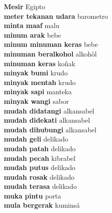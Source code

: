 \textbf{ Mesir  } Egipto \\
\textbf{ meter tekanan udara  } barometro \\
\textbf{ minta maaf  } malu \\
\textbf{ minum arak  } bebe \\
\textbf{ minum minuman keras  } bebe \\
\textbf{ minuman beralkohol  } alkohòl \\
\textbf{ minuman keras  } koñak \\
\textbf{ minyak bumi  } krudo \\
\textbf{ minyak mentah  } krudo \\
\textbf{ minyak sapi  } manteka \\
\textbf{ minyak wangi  } sabor \\
\textbf{ mudah didatangi  } alkansabel \\
\textbf{ mudah didekati  } alkansabel \\
\textbf{ mudah dihubungi  } alkansabel \\
\textbf{ mudah geli  } delikado \\
\textbf{ mudah patah  } delikado \\
\textbf{ mudah pecah  } kibrabel \\
\textbf{ mudah putus  } delikado \\
\textbf{ mudah rosak  } delikado \\
\textbf{ mudah terasa  } delikado \\
\textbf{ muka pintu  } porta \\
\textbf{ mula bergerak  } kuminsá \\
